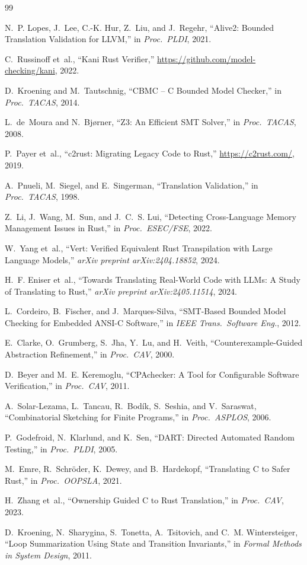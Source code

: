 \documentclass[10pt,letterpaper]{article}
\begin{document}
\begin{thebibliography}{99}

N.~P. Lopes, J.~Lee, C.-K. Hur, Z.~Liu, and J.~Regehr,
``Alive2: Bounded Translation Validation for LLVM,''
in \emph{Proc.\ PLDI}, 2021.

C.~Russinoff et~al.,
``Kani Rust Verifier,''
\url{https://github.com/model-checking/kani}, 2022.

D.~Kroening and M.~Tautschnig,
``CBMC -- C Bounded Model Checker,''
in \emph{Proc.\ TACAS}, 2014.

L.~de~Moura and N.~Bj{\o}rner,
``Z3: An Efficient SMT Solver,''
in \emph{Proc.\ TACAS}, 2008.

P.~Payer et~al.,
``c2rust: Migrating Legacy Code to Rust,''
\url{https://c2rust.com/}, 2019.

A.~Pnueli, M.~Siegel, and E.~Singerman,
``Translation Validation,''
in \emph{Proc.\ TACAS}, 1998.

Z.~Li, J.~Wang, M.~Sun, and J.~C.~S. Lui,
``Detecting Cross-Language Memory Management Issues in Rust,''
in \emph{Proc.\ ESEC/FSE}, 2022.

W.~Yang et~al.,
``Vert: Verified Equivalent Rust Transpilation with Large Language Models,''
\emph{arXiv preprint arXiv:2404.18852}, 2024.

H.~F. Eniser et~al.,
``Towards Translating Real-World Code with LLMs: A Study of Translating to Rust,''
\emph{arXiv preprint arXiv:2405.11514}, 2024.

L.~Cordeiro, B.~Fischer, and J.~Marques-Silva,
``SMT-Based Bounded Model Checking for Embedded ANSI-C Software,''
in \emph{IEEE Trans.\ Software Eng.}, 2012.

E.~Clarke, O.~Grumberg, S.~Jha, Y.~Lu, and H.~Veith,
``Counterexample-Guided Abstraction Refinement,''
in \emph{Proc.\ CAV}, 2000.

D.~Beyer and M.~E. Keremoglu,
``CPAchecker: A Tool for Configurable Software Verification,''
in \emph{Proc.\ CAV}, 2011.

A.~Solar-Lezama, L.~Tancau, R.~Bod\'{i}k, S.~Seshia, and V.~Saraswat,
``Combinatorial Sketching for Finite Programs,''
in \emph{Proc.\ ASPLOS}, 2006.

P.~Godefroid, N.~Klarlund, and K.~Sen,
``DART: Directed Automated Random Testing,''
in \emph{Proc.\ PLDI}, 2005.

M.~Emre, R.~Schr\"{o}der, K.~Dewey, and B.~Hardekopf,
``Translating C to Safer Rust,''
in \emph{Proc.\ OOPSLA}, 2021.

H.~Zhang et~al.,
``Ownership Guided C to Rust Translation,''
in \emph{Proc.\ CAV}, 2023.

D.~Kroening, N.~Sharygina, S.~Tonetta, A.~Tsitovich, and C.~M. Wintersteiger,
``Loop Summarization Using State and Transition Invariants,''
in \emph{Formal Methods in System Design}, 2011.

\end{thebibliography}
\end{document}
